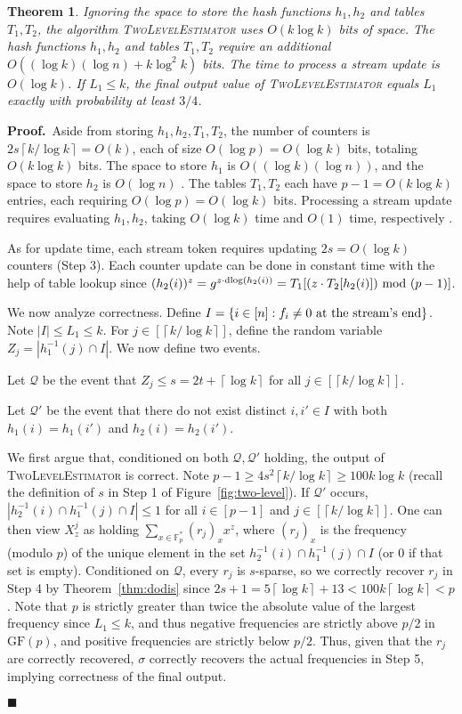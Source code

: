 \documentclass[letterpaper,11pt]{article}
\newcommand{\ceil}[1]{\left\lceil #1 \right\rceil}
\newcommand{\GF}{\mathrm{GF}}
\newcommand{\dlog}{\mathrm{dlog}}
\renewcommand{\mod}{\hbox{ mod }}
\newcommand{\TheoremName}[1]{\label{thm:#1}}
\newcommand{\Theorem}[1]{Theorem~\ref{thm:#1}}
\newcommand{\Figure}[1]{Figure~\ref{fig:#1}}
\newtheorem{theorem}{Theorem}\newtheorem{corollary}[theorem]{Corollary}
\newcommand{\proofbelow}{3pt}
\newcommand{\afterproof}{\hfill $\blacksquare$ \par \vspace{\proofbelow}}
\renewenvironment{proof}{\noindent\textbf{Proof.}\,}{\afterproof}
\begin{document}
\begin{theorem}\TheoremName{two-level}
Ignoring the space to store the hash functions $h_1,h_2$ and tables
$T_1,T_2$, the algorithm \textsc{TwoLevelEstimator}
uses $O(k\log k)$ bits of space.  The hash functions $h_1,h_2$ and
tables $T_1,T_2$ require an additional $O((\log
k)(\log n) + k\log^2 k)$ bits.  The time to
process a stream update is $O(\log k)$.  If $L_1 \le k$, the final
output value of \textsc{TwoLevelEstimator} 
equals $L_1$ exactly with probability at least $3/4$.
\end{theorem}
\begin{proof}
Aside from storing $h_1,h_2,T_1,T_2$,  the number of counters is
$2s\ceil{k/\log k} = O(k)$, each of size $O(\log p) = O(\log k)$ bits,
totaling $O(k\log k)$ bits.
The space to store $h_1$ is $O((\log k)(\log n))$,
and the space to store $h_2$ is $O(\log n)$ \cite{CW79}.  The
tables $T_1,T_2$ each have $p-1 = O(k\log k)$ entries, each
requiring $O(\log p) = O(\log k)$ bits. Processing a stream update
requires evaluating $h_1,h_2$, taking $O(\log k)$ time and $O(1)$
time, respectively \cite{CW79}. 

As for update time, each stream token requires updating $2s = O(\log k)$
counters (Step 3). Each counter update can be done in constant time
with the help of table lookup since $(h_2(i))^z = g^{z\cdot
  \dlog(h_2(i))} = T_1[(z\cdot T_2[h_2(i)])\mod (p-1)]$.

We now analyze correctness.  Define $I = \{i\in [n] : f_i\neq 0\hbox{
  at the stream's end}\}$.
Note $|I| \le L_1 \le k$.  For
$j\in[\ceil{k/\log k}]$, define the random variable $Z_j =
|h_1^{-1}(j)\cap I|$.  We now define two events.

Let $\mathcal{Q}$ be the event that $Z_j \le s = 2t + \ceil{\log k}$
for all $j\in[\ceil{k/\log k}]$.

Let $\mathcal{Q}'$ be the event that there do not exist distinct
$i,i'\in I$ with both $h_1(i) = h_1(i')$ and $h_2(i) = h_2(i')$.

We first argue that, conditioned on both $\mathcal{Q},\mathcal{Q}'$
holding, the output of \textsc{TwoLevelEstimator} is
correct. Note $p-1 \ge 4s^2\ceil{k/\log k} \ge 100k\log k$ (recall the
definition of $s$ in Step 1 of \Figure{two-level}). If $\mathcal{Q}'$
occurs,
$|h_2^{-1}(i)\cap h_1^{-1}(j)\cap I| \le 1$ for all $i\in [p-1]$ and
$j\in[\ceil{k/\log k}]$.  One can then view $X_z^j$ as holding
$\sum_{x\in\mathbb{F}_p^*}(r_j)_x x^z$, where $(r_j)_x$ is the frequency
(modulo $p$) of the unique
element in the set $h_2^{-1}(i)\cap h_1^{-1}(j)\cap I$ (or $0$ if that
set is empty).  Conditioned on $\mathcal{Q}$, every $r_j$ is
$s$-sparse, so we correctly recover $r_j$ in Step 4 by
\Theorem{dodis} since $2s + 1 =
5\ceil{\log k} + 13 < 100k\ceil{\log k} < p$.  Note that $p$ is
strictly greater than twice the absolute value of the largest
frequency since $L_1 \le k$, and thus negative frequencies
are strictly above $p/2$ in $\GF(p)$, and positive frequencies are
strictly below $p/2$. Thus, given that the $r_j$
are correctly recovered, $\sigma$ correctly recovers the
actual frequencies in Step 5, implying correctness of the final
output.


\end{proof}
\end{document}
